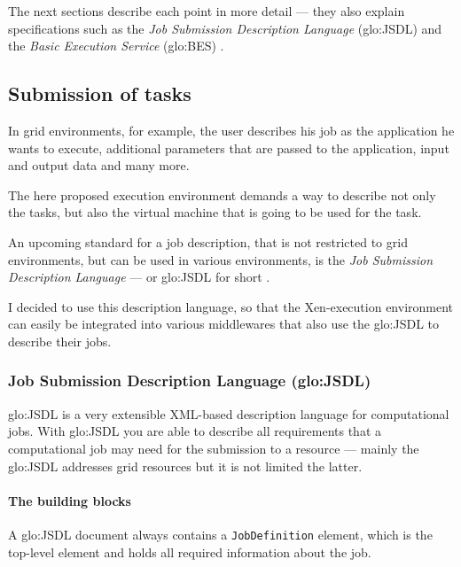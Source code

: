 The next sections describe each point in more detail --- they also explain
specifications  such  as the  \emph{Job  Submission Description  Language}
(\gls{glo:JSDL}) \cite{jsdl-spec}  and the \emph{Basic  Execution Service}
(\gls{glo:BES}) \cite{ogsa-bes}.

\subsection{Submission of tasks}
\label{sec:req-task-submission}

In  grid environments,  for example,  the user  describes his  job  as the
application he wants to execute,  additional parameters that are passed to
the application, input and output data and many more.

The here proposed execution environment demands a way to describe not only
the tasks, but also  the virtual machine that is going to  be used for the
task.

An upcoming standard for a job description, that is not restricted to grid
environments, but  can be used  in various environments, is  the \emph{Job
  Submission  Description  Language}   ---  or  \gls{glo:JSDL}  for  short
\cite{jsdl-spec}.

I  decided to  use this  description language,  so that  the Xen-execution
environment can  easily be integrated  into various middlewares  that also
use the \gls{glo:JSDL} to describe their jobs.

\subsubsection{Job Submission Description Language (\gls{glo:JSDL})}

\gls{glo:JSDL}  is a  very extensible  XML-based description  language for
computational  jobs.  With  \gls{glo:JSDL} you  are able  to  describe all
requirements that  a computational  job may need  for the submission  to a
resource --- mainly the \gls{glo:JSDL}  addresses grid resources but it is
not limited the latter.

\paragraph{The building   blocks}

A  \gls{glo:JSDL}   document  always  contains   a  \texttt{JobDefinition}
element, which is the top-level element and holds all required information
about the job.

